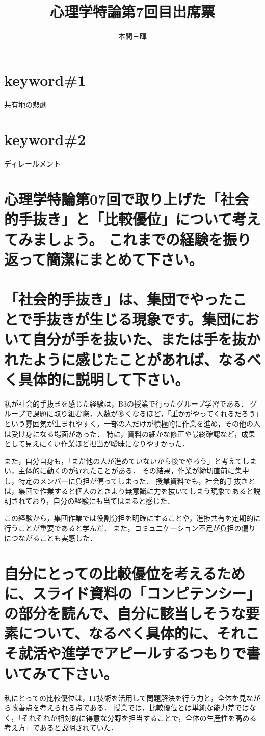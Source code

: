 \documentclass[titlepage,a4paper]{jsarticle}
\title{心理学特論第7回目出席票}
\author{本間三暉}
\begin{document}
\maketitle
\section*{keyword\#1}
共有地の悲劇
\section*{keyword\#2}
ディレールメント
\section*{心理学特論第07回で取り上げた「社会的手抜き」と「比較優位」について考えてみましょう。
これまでの経験を振り返って簡潔にまとめて下さい。}
\section{「社会的手抜き」は、集団でやったことで手抜きが生じる現象です。集団において自分が手を抜いた、または手を抜かれたように感じたことがあれば、なるべく具体的に説明して下さい。}
私が社会的手抜きを感じた経験は，B3の授業で行ったグループ学習である．
グループで課題に取り組む際，人数が多くなるほど，「誰かがやってくれるだろう」という雰囲気が生まれやすく，一部の人だけが積極的に作業を進め，その他の人は受け身になる場面があった．
特に，資料の細かな修正や最終確認など，成果として見えにくい作業ほど担当が曖昧になりやすかった．

また，自分自身も，「まだ他の人が進めていないから後でやろう」と考えてしまい，主体的に動くのが遅れたことがある．
その結果，作業が締切直前に集中し，特定のメンバーに負担が偏ってしまった．
授業資料でも，社会的手抜きとは，集団で作業すると個人のときより無意識に力を抜いてしまう現象であると説明されており，自分の経験にも当てはまると感じた．

この経験から，集団作業では役割分担を明確にすることや，進捗共有を定期的に行うことが重要であると学んだ．
また，コミュニケーション不足が負担の偏りにつながることも実感した．

\section{自分にとっての比較優位を考えるために、スライド資料の「コンピテンシー」の部分を読んで、自分に該当しそうな要素について、なるべく具体的に、それこそ就活や進学でアピールするつもりで書いてみて下さい。}
私にとっての比較優位は，IT技術を活用して問題解決を行う力と，全体を見ながら改善点を考えられる点である．
授業では，比較優位とは単純な能力差ではなく，「それぞれが相対的に得意な分野を担当することで，全体の生産性を高める考え方」であると説明されていた．
\end{document}
